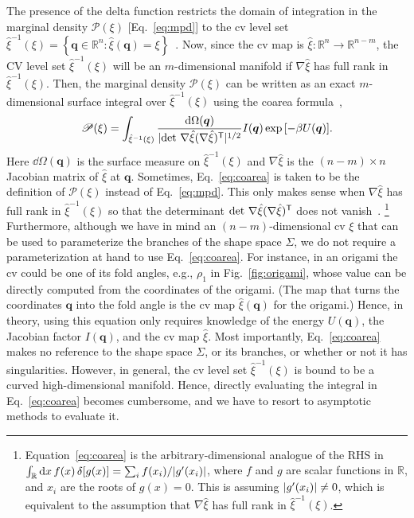 The presence of the delta function restricts the domain of integration in the marginal density $\mathscr{P}(\xi)$ [Eq.~\eqref{eq:mpd}] to the \ac{cv} level set $\hat{\xi}^{-1}(\xi) = \left\{\bm{q} \in \mathbb{R}^{n}: \hat{\xi}(\bm{q}) = \xi\right\}$~\cite{hartmann2011}.
Now, since the \ac{cv} map is $\hat{\xi}: \mathbb{R}^{n} \to \mathbb{R}^{n-m}$, the CV level set $\hat{\xi}^{-1}(\xi)$ will be an $m$-dimensional manifold if $\nabla\hat{\xi}$ has full rank in $\hat{\xi}^{-1}(\xi)$.
Then, the marginal density $\mathscr{P}(\xi)$ can be written as an exact $m$-dimensional surface integral over $\hat{\xi}^{-1}(\xi)$ using the coarea formula~\cite{hartmann2007,lelievre2010,hartmann2011,diaconis2013},
%
\begin{equation}
  \mathscr{P}(\xi) = \int_{\hat{\xi}^{-1}(\xi)} \frac{\mathrm{d}\Omega(\bm{q})}{\lvert\det\,\nabla\hat{\xi}(\nabla\hat{\xi})^\mathsf{T}\rvert^{1/2}} I(\bm{q}) \exp{\left[-\beta U(\bm{q})\right]}.
  \label{eq:coarea}
\end{equation}
%
Here $\dd\Omega(\bm{q})$ is the surface measure on $\hat{\xi}^{-1}(\xi)$ and $\nabla\hat{\xi}$ is the $(n-m)\times n$ Jacobian matrix of $\hat{\xi}$ at $\bm{q}$.
Sometimes, Eq.~\eqref{eq:coarea} is taken to be the definition of $\mathscr{P}(\xi)$ instead of Eq.~\eqref{eq:mpd}.
This only makes sense when $\nabla\hat{\xi}$ has full rank in $\hat{\xi}^{-1}(\xi)$ so that the determinant $\det\,\nabla\hat{\xi}(\nabla\hat{\xi})^\mathsf{T}$ does not vanish~\cite{lelievre2010}.%
\footnote{Equation~\eqref{eq:coarea} is the arbitrary-dimensional analogue of the RHS in $\int_{\mathbb{R}} \mathrm{d}{x}\, f(x)\, \delta[g(x)] = \sum_{i} f(x_{i})/\lvert g'(x_{i})\rvert$, where $f$ and $g$ are scalar functions in $\mathbb{R}$, and $x_{i}$ are the roots of $g(x) = 0$. This is assuming $\lvert g'(x_{i})\rvert \neq 0$, which is equivalent to the assumption that $\nabla\hat{\xi}$ has full rank in $\hat{\xi}^{-1}(\xi)$.}
Furthermore, although we have in mind an $(n-m)$-dimensional \ac{cv} $\xi$ that can be used to parameterize the branches of the shape space $\Sigma$, we do not require a parameterization at hand to use Eq.~\eqref{eq:coarea}.
For instance, in an origami the \ac{cv} could be one of its fold angles, e.g., $\rho_{1}$ in Fig.~\ref{fig:origami}, whose value can be directly computed from the coordinates of the origami.
(The map that turns the coordinates $\bm{q}$ into the fold angle is the \ac{cv} map $\hat{\xi}(\bm{q})$ for the origami.)
Hence, in theory, using this equation only requires knowledge of the energy $U(\bm{q})$, the Jacobian factor $I(\bm{q})$, and the \ac{cv} map $\hat{\xi}$.
Most importantly, Eq.~\eqref{eq:coarea} makes no reference to the shape space $\Sigma$, or its branches, or whether or not it has singularities.
However, in general, the \ac{cv} level set $\hat{\xi}^{-1}(\xi)$ is bound to be a curved high-dimensional manifold.
Hence, directly evaluating the integral in Eq.~\eqref{eq:coarea} becomes cumbersome, and we have to resort to asymptotic methods to evaluate it.

